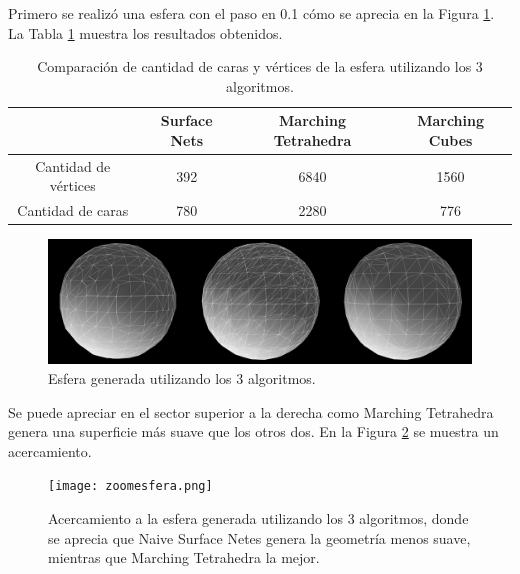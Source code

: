 \documentclass[12pt]{article}
\begin{document}
Primero se realizó una esfera con el paso en 0.1 cómo se aprecia en la Figura \ref{esf1g}. La Tabla \ref{esf1t} muestra los resultados obtenidos.
\begin{table}[h!]
  \centering
  \begin{tabular}{cccc}
    \toprule
    & Surface Nets & Marching Tetrahedra & Marching Cubes\\
    \midrule
    Cantidad de vértices & 392 & 6840 & 1560\\
    Cantidad de caras & 780 & 2280 & 776\\
    \bottomrule
  \end{tabular}
  \caption{Comparación de cantidad de caras y vértices de la esfera utilizando los 3 algoritmos.}
  \label{esf1t}
\end{table}
\begin{figure}[h!]
\includegraphics[width=\linewidth,center]{compec1.png}
\caption{Esfera generada utilizando los 3 algoritmos.}
  \label{esf1g}
\end{figure}

Se puede apreciar en el sector superior a la derecha como Marching Tetrahedra genera una superficie más suave que los otros dos. En la Figura \ref{acercamientoEsf} se muestra un acercamiento.
\begin{figure}[h!]
\texttt{[image: zoomesfera.png]}
\caption{Acercamiento a la esfera generada utilizando los 3 algoritmos, donde se aprecia que Naive Surface Netes genera la geometría menos suave, mientras que Marching Tetrahedra la mejor.}
\label{acercamientoEsf}
\end{figure}
\end{document}
